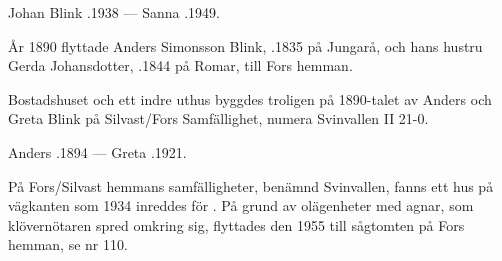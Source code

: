 Johan Blink .1938  ---  Sanna .1949.


År 1890 flyttade Anders Simonsson Blink, .1835 på Jungarå, och hans hustru Gerda Johansdotter, .1844 på Romar, till Fors hemman.
\begin{jhchildren}
  \item {}
  \item {}
  \item {}
  \item {}
\end{jhchildren}
Bostadshuset och ett indre uthus byggdes troligen på 1890-talet av Anders och Greta Blink på Silvast/Fors Samfällighet, numera Svinvallen	II 21-0.

Anders .1894  ---  Greta .1921.


På Fors/Silvast hemmans samfälligheter, benämnd Svinvallen, fanns ett hus på vägkanten som 1934 inreddes för . På grund av olägenheter med agnar, som klövernötaren spred omkring sig, flyttades den 1955 till sågtomten på Fors hemman, se nr 110.
